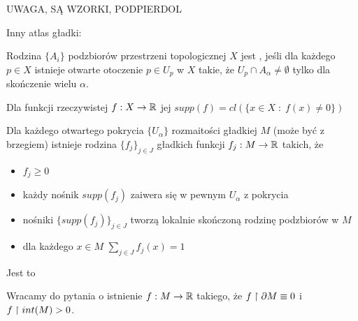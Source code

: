 {\large\color{orange}UWAGA, SĄ WZORKI, PODPIERDOL}

Inny atlas gładki:

Rodzina $\{A_i\}$ podzbiorów przestrzeni topologicznej $X$ jest , jeśli dla każdego $p\in X$ istnieje otwarte otoczenie $p\in U_p$ w $X$ takie, że $U_p\cap A_\alpha\neq\emptyset$ tylko dla skończenie wielu $\alpha$.

Dla funkcji rzeczywistej $f:X\to\mathbb{R}$ jej  $supp(f)=cl(\{x\in X\;:\;f(x)\neq0\})$

 Dla każdego otwartego pokrycia $\{U_\alpha\}$ rozmaitości gładkiej $M$ (może być z brzegiem) istnieje rodzina $\{f_j\}_{j\in J}$ gładkich funkcji $f_j:M\to\mathbb{R}$ takich, że
\begin{itemize}
    \item $f_j\geq0$
    \item każdy nośnik $supp(f_j)$ zaiwera się w pewnym $U_\alpha$ z pokrycia
    \item nośniki $\{supp(f_j)\}_{j\in J}$ tworzą lokalnie skończoną rodzinę podzbiorów w $M$
    \item dla każdego $x\in M$ $\sum\limits_{j\in J}f_j(x)=1$
\end{itemize}
Jest to 

Wracamy do pytania o istnienie $f:M\to\mathbb{R}$ takiego, że $f\upharpoonright\partial M\equiv 0$ i $f\upharpoonright int(M)>0$. 
